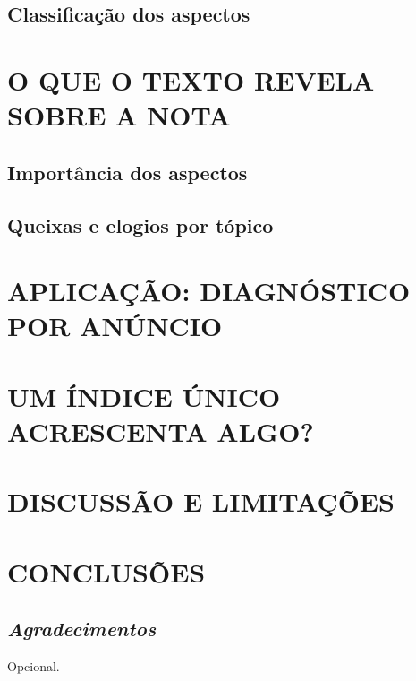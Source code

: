 \documentclass[oneside,a4paper,portuguese,links]{EngUCP}
\begin{document}
\subsection{Classificação dos aspectos}                    %

\section{O QUE O TEXTO REVELA SOBRE A NOTA}
\subsection{Importância dos aspectos}   %
\subsection{Queixas e elogios por tópico} %

\section{APLICAÇÃO: DIAGNÓSTICO POR ANÚNCIO} %

\section{UM ÍNDICE ÚNICO ACRESCENTA ALGO?}

\section{DISCUSSÃO E LIMITAÇÕES} %

\section{CONCLUSÕES} %

\subsection*{\textit{Agradecimentos}}
\noindent Opcional.



\end{document}
